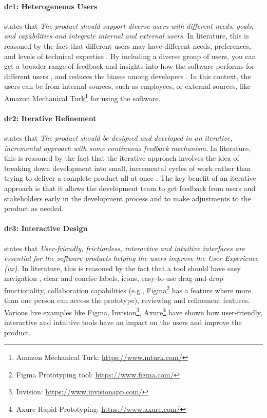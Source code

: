 \paragraph{\ac{dr}1: Heterogeneous Users} states that \textit{The product should support diverse users with different needs, goals, and capabilities and integrate internal and external users.} 
In literature, this is reasoned by the fact that different users may have different needs, preferences, and levels of technical expertise \cite{misc:lean:steve}.
By including a diverse group of users, you can get a broader range of feedback and insights into how the software performs for different users \cite{article:prototyping:weichbroth}, and reduces the biases among developers \cite{misc:lean:burmeister}.
In this context, the users can be from internal sources, such as employees, or external sources, like Amazon Mechanical Turk\footnote{Amazon Mechanical Turk: \url{https://www.mturk.com/}} for using the software.

\paragraph{\ac{dr}2: Iterative Refinement} states that \textit{The product should be designed and developed in an iterative, incremental approach with some continuous feedback mechanism.} 
In literature, this is reasoned by the fact that the iterative approach involves the idea of breaking down development into small, incremental cycles of work rather than trying to deliver a complete product all at once \cite{misc:lean:tutorial}.
The key benefit of an iterative approach is that it allows the development team to get feedback from users and stakeholders early in the development process and to make adjustments \cite{article:experiments:lindgren} to the product as needed.

\paragraph{\ac{dr}3: Interactive Design} states that \textit{User-friendly, frictionless, interactive and intuitive interfaces are essential for the software products helping the users improve the User Experience (\ac{ux}).} 
In literature, this is reasoned by the fact that a tool should have easy navigation \cite{article:prototyping:hoffnagle}, clear and concise labels, icons, easy-to-use drag-and-drop functionality, collaboration capabilities (e.g., Figma\footnote{Figma Prototyping tool: \url{https://www.figma.com/}} has a feature where more than one person can access the prototype), reviewing and refinement \cite{paper:prototyping:luqi} features.
Various live examples like Figma, Invision\footnote{Invision: \url{https://www.invisionapp.com/}}, Axure\footnote{Axure Rapid Prototyping: \url{https://www.axure.com/}} have shown how user-friendly, interactive and intuitive tools have an impact on the users and improve the product.

